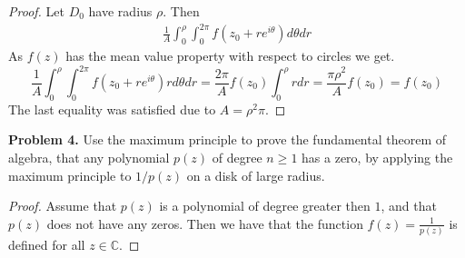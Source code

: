 \documentclass[letter,12pt,reqno]{article}
\begin{document}
\begin{proof}
    Let $D_0$ have radius $\rho$. Then 
    \begin{align*}
    \frac{1}{A}\int_0^\rho\int_0^{2\pi}f(z_0+re^{i\theta})d\theta dr
    \end{align*}
    As $f(z)$ has the mean value property with respect to circles we get.
    \[
        \frac{1}{A}\int_0^\rho\int_0^{2\pi}f(z_0+re^{i\theta})rd\theta dr
        =\frac{2\pi}{A}f(z_0) \int_0^\rho r dr=\frac{\pi\rho^2}{A}f(z_0) =f(z_0)
    \]
    The last equality was satisfied due to $A=\rho^2 \pi$.
\end{proof}

\begin{tcolorbox}
    \textbf{Problem 4.}
    Use the maximum principle to prove the fundamental theorem of algebra, that any polynomial $p(z)$ of degree $n \geq 1$ has a zero, by applying the maximum principle to $1/p(z)$ on a disk of large radius.  
\end{tcolorbox}

\begin{proof}
    Assume that $p(z)$ is a polynomial of degree greater then $1$, and that $p(z)$ does not have any zeros. Then we have that the function $f(z)=\frac{1}{p(z)}$ is defined for all $z\in \mathbb{C}$. 
\end{proof}
\end{document}
